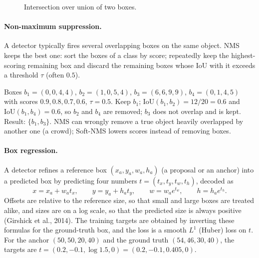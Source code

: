 \begin{notechapter}
\begin{figure}[ht]
\centering
{}
\caption{Intersection over union of two boxes.}
\label{detection-segmentation:fig:iou}
\end{figure}

\paragraph{Non-maximum suppression.} A detector typically fires several overlapping boxes
on the same object. NMS keeps the best one: sort the boxes of a class by score; repeatedly keep
the highest-scoring remaining box and discard the remaining boxes whose IoU with it exceeds
a threshold $\tau$ (often $0.5$).

\begin{example}[NMS]\label{detection-segmentation:ex:nms}
Boxes $b_1 = (0,0,4,4)$, $b_2 = (1,0,5,4)$, $b_3 = (6,6,9,9)$, $b_4 = (0,1,4,5)$ with scores $0.9, 0.8, 0.7, 0.6$, $\tau = 0.5$.
Keep $b_1$; $\mathrm{IoU}(b_1, b_2) = 12/20 = 0.6$ and $\mathrm{IoU}(b_1, b_4) = 0.6$, so $b_2$ and $b_4$ are removed; $b_3$ does not overlap and is
kept. Result: $\{b_1, b_3\}$. NMS can wrongly remove a true object heavily overlapped by another one
(a crowd); Soft-NMS lowers scores instead of removing boxes.
\end{example}

\paragraph{Box regression.} A detector refines a reference box $(x_a, y_a, w_a, h_a)$ (a proposal or an
anchor) into a predicted box by predicting four numbers $t = (t_x, t_y, t_w, t_h)$, decoded as
\[
  x = x_a + w_at_x,\qquad y = y_a + h_at_y,\qquad w = w_ae^{t_w},\qquad h = h_ae^{t_h} .
\]
Offsets are relative to the reference size, so that small and large boxes are treated alike,
and sizes are on a log scale, so that the predicted size is always positive (Girshick et al.,
2014). The training targets are obtained by inverting these formulas for the ground-truth
box, and the loss is a smooth $L^1$ (Huber) loss on $t$. For the anchor $(50, 50, 20, 40)$ and the
ground truth $(54, 46, 30, 40)$, the targets are $t = (0.2, -0.1, \log1.5, 0) = (0.2, -0.1, 0.405, 0)$.


\end{notechapter}

